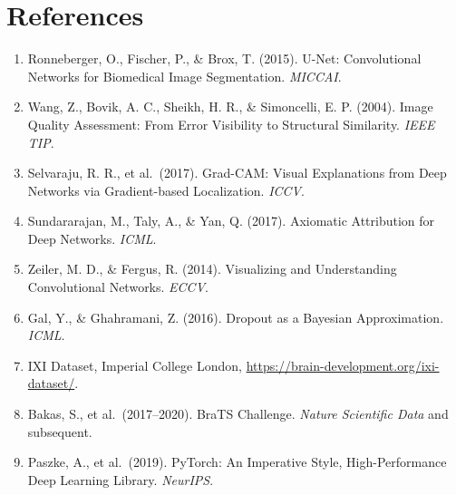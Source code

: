 \documentclass[10pt,a4paper]{article}
\begin{document}
\section{References}
\label{app:refs}
\footnotesize
\begin{enumerate}
    \item Ronneberger, O., Fischer, P., \& Brox, T. (2015). U-Net:
          Convolutional Networks for Biomedical Image Segmentation.
          \emph{MICCAI}.
    \item Wang, Z., Bovik, A. C., Sheikh, H. R., \& Simoncelli, E. P.
          (2004). Image Quality Assessment: From Error Visibility to
          Structural Similarity. \emph{IEEE TIP}.
    \item Selvaraju, R. R., et al.\ (2017). Grad-CAM: Visual Explanations
          from Deep Networks via Gradient-based Localization. \emph{ICCV}.
    \item Sundararajan, M., Taly, A., \& Yan, Q. (2017). Axiomatic
          Attribution for Deep Networks. \emph{ICML}.
    \item Zeiler, M. D., \& Fergus, R. (2014). Visualizing and
          Understanding Convolutional Networks. \emph{ECCV}.
    \item Gal, Y., \& Ghahramani, Z. (2016). Dropout as a Bayesian
          Approximation. \emph{ICML}.
    \item IXI Dataset, Imperial College London,
          \url{https://brain-development.org/ixi-dataset/}.
    \item Bakas, S., et al.\ (2017--2020). BraTS Challenge.
          \emph{Nature Scientific Data} and subsequent.
    \item Paszke, A., et al.\ (2019). PyTorch: An Imperative Style,
          High-Performance Deep Learning Library. \emph{NeurIPS}.
\end{enumerate}
\end{document}
